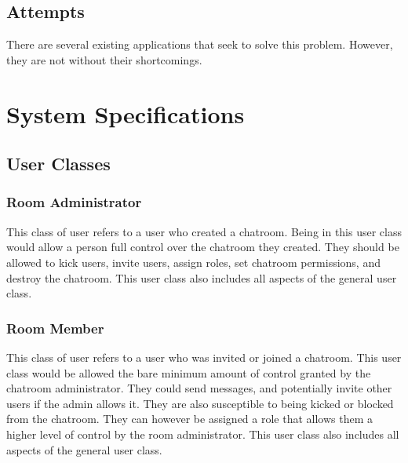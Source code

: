 \documentclass[11pt]{article}
\theoremstyle{plain}
\theoremstyle{definition}
\begin{document}
\subsection{Attempts}\label{sec:attempts}
There are several existing applications that seek to solve this problem. However, they are not without their shortcomings.

\setlength{\tabcolsep}{4pt} %

\section{System Specifications}\label{sec:sysspecs}
\subsection{User Classes}\label{sec:userclasses}

\subsubsection{Room Administrator}
This class of user refers to a user who created a chatroom. Being in this user class would allow a person full control over the chatroom they created. They should be allowed to kick users, invite users, assign roles, set chatroom permissions, and destroy the chatroom. This user class also includes all aspects of the general user class. 
\subsubsection{Room Member}
This class of user refers to a user who was invited or joined a chatroom. This user class would be allowed the bare minimum amount of control granted by the chatroom administrator. They could send messages, and potentially invite other users if the admin allows it. They are also susceptible to being kicked or blocked from the chatroom. They can however be assigned a role that allows them a higher level of control by the room administrator.  This user class also includes all aspects of the general user class. 
\end{document}
